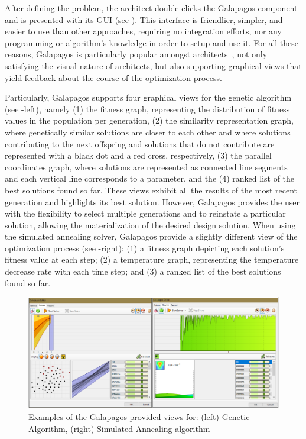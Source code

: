 After defining the problem, the architect double clicks the Galapagos component and is presented with its \ac{GUI} (see ). This interface is friendlier, simpler, and easier to use than other approaches, requiring no integration efforts, nor any programming or algorithm's knowledge in order to setup and use it. For all these reasons, Galapagos is particularly popular amongst architects~\cite{Wortmann2017ADO}, not only satisfying the visual nature of architects, but also supporting graphical views that yield feedback about the course of the optimization process. 

Particularly, Galapagos supports four graphical views for the genetic algorithm (see -left), namely (1) the fitness graph, representing the distribution of fitness values in the population per generation, (2) the similarity representation graph, where genetically similar solutions are closer to each other and where solutions contributing to the next offspring and solutions that do not contribute are represented with a black dot and a red cross, respectively, (3) the parallel coordinates graph, where solutions are represented as connected line segments and each vertical line corresponds to a parameter, and the (4) ranked list of the best solutions found so far. These views exhibit all the results of the most recent generation and highlights its best solution. However, Galapagos provides the user with the flexibility to select multiple generations and to reinstate a particular solution, allowing the materialization of the desired design solution. When using the simulated annealing solver, Galapagos provide a slightly different view of the optimization process (see -right): (1) a fitness graph depicting each solution's fitness value at each step; (2) a temperature graph, representing the temperature decrease rate with each time step; and (3) a ranked list of the best solutions found so far.
	
\begin{figure}
\centering
\includegraphics[width=\textwidth]{Images/Background/Galapagos/galapagos-results.PNG}
\caption[Galapagos optimization results view]{Examples of the Galapagos provided views for: (left) Genetic Algorithm, (right) Simulated Annealing algorithm}
\label{fig:galapagosvisualmenu}
\end{figure}

